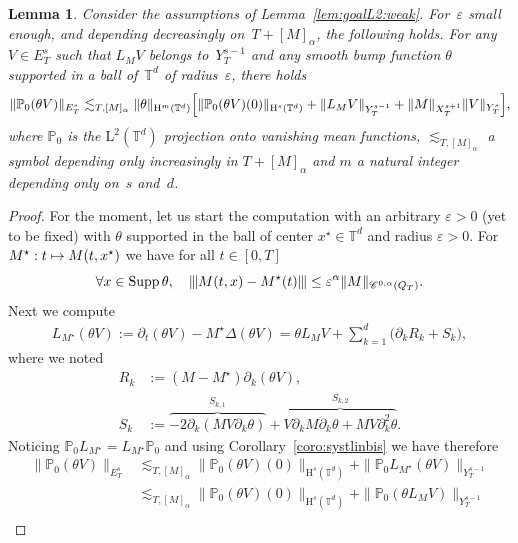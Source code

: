 \documentclass[JEP,XML,SOM,Unicode,published]{cedram}
\newcommand\mto{\mathchoice{\longmapsto}{\mapsto}{\mapsto}{\mapsto}}
\DeclareMathOperator{\Supp}{Supp}
\newtheorem{lem}[prop]{Lemma}
\theoremstyle{definition}
\newcommand\T{\mathbb{T}}
\renewcommand\H{\mathrm{H}}
\renewcommand\L{\mathrm{L}}
\let\ep\varepsilon
\newcommand{\vertiii}[1]{{\vert\kern-0.08em\vert\kern-0.08em\vert #1 \vert\kern-0.08em\vert\kern-0.08em\vert}}
\begin{document}
\begin{lem}\label{lem:loc}
Consider the assumptions of Lemma~\ref{lem:goalL2:weak}. For~$\ep$ small enough, and depending decreasingly on~$T+[M]_\alpha$, the following holds. For any $V\in E_T^s$ such that $L_{M }V $ belongs to~$Y_T^{s-1}$ and any smooth bump function $\theta$ supported in a ball of~$\T^d$ of radius~$\ep$, there holds
\[
\|\mathbb{P}_0(\theta V)\|_{E_T^s} \lesssim_{T,[M]_\alpha}\|\theta\|_{\H^{m}(\T^d)}\Bigl[\|\mathbb{P}_0(\theta V)(0)\|_{\H^s(\T^d)} + \| L_{M }V\|_{Y_T^{s-1}} + \|M\|_{X_T^{s+1}} \| V \|_{Y_T^s}\Bigr],
\]
where $\mathbb{P}_0$ is the $\L^2(\T^d)$ projection onto vanishing mean functions, $\lesssim_{T,[M]_\alpha}$ a symbol depending only increasingly in $T+[M]_\alpha$ and $m$ a natural integer depending only on~$s$ and~$d$.
\end{lem}
\begin{proof}
For the moment, let us start the computation with an arbitrary $\ep>0$ (yet to be fixed) with $\theta$ supported in the ball of center $x^\star \in \T^d$ and radius $\ep>0$. For $M^\star: t\mto M(t,x^\star)$ we have for all $t\in[0,T]$
\begin{equation}\label{PstarP}
\forall x \in \Supp \theta, \quad \vertiii{M(t,x)-M^\star(t)} \leq \ep^\alpha \|M\|_{\mathscr{C}^{0,\alpha}(Q_T)}.
\end{equation}
Next we compute
\begin{align} \label{eq:defF}
L_{M^\star}(\theta V):= \partial_t(\theta V)- M^\star \Delta (\theta V)= \theta L_{M}V + \sum_{k=1}^d \bigl(\partial_kR_k + S_k \bigr),
\end{align}
where we noted
\begin{align}
\label{eq:Rk} R_k &:= (M-M^\star)\partial_k(\theta V),\\
\label{eq:Sk} S_k &:= \stackrel{S_{k,1}}{\overbrace{-2 \partial_k (M V \partial_k \theta) }} + \stackrel{S_{k,2}}{\overbrace{ V \partial_k M \partial_k \theta+MV \partial^2_k \theta }}.
\end{align}
Noticing $\mathbb{P}_0L_{M^\star} = L_{M^\star}\mathbb{P}_0$ and using Corollary~\ref{coro:systlinbis} we have therefore
\begin{align*}
\|\mathbb{P}_0(\theta V)\|_{E_T^s} &\lesssim_{T,[M]_\alpha} \|\mathbb{P}_0(\theta V)(0)\|_{\H^s(\T^d)} + \|\mathbb{P}_0 L_{M^\star}(\theta V)\|_{Y_T^{s-1}}\\
&\lesssim_{T,[M]_\alpha} \|\mathbb{P}_0(\theta V)(0)\|_{\H^s(\T^d)} + \|\mathbb{P}_0(\theta L_M V)\|_{Y_T^{s-1}}\\[
-5pt]

\end{align*}
\end{proof}
\end{document}
